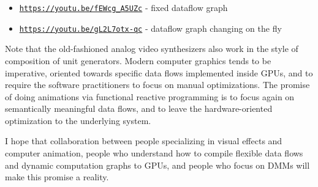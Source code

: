 \documentclass{article}
\begin{document}
\begin{itemize}
   \item \href{https://youtu.be/fEWcg_A5UZc}{\tt https://youtu.be/fEWcg\_A5UZc} - fixed dataflow graph
   \item \href{https://youtu.be/gL2L7otx-qc}{\tt https://youtu.be/gL2L7otx-qc} - dataflow graph changing on the fly 
\end{itemize}


Note that the old-fashioned
analog video synthesizers also work in the style of composition of unit
generators. Modern computer graphics tends to be imperative, oriented towards
specific data flows implemented inside GPUs, and to require the software practitioners to
focus on manual optimizations. The promise of doing animations via functional reactive
programming is to focus again on semantically meaningful
data flows, and to leave the hardware-oriented optimization to the underlying system.

I hope that collaboration between people specializing in visual effects and computer animation,
people who understand how to compile flexible data flows and dynamic computation graphs to GPUs,
and people who focus on DMMs will make this promise a reality.
\end{document}
